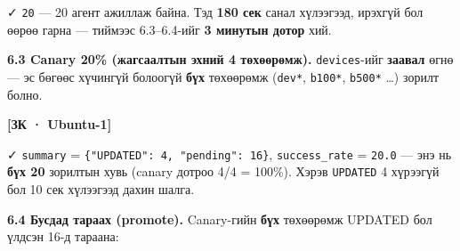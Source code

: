 ✓ \texttt{20} --- 20 агент ажиллаж байна. Тэд \textbf{180 сек} санал хүлээгээд, ирэхгүй бол өөрөө гарна --- тиймээс 6.3--6.4-ийг \textbf{3 минутын дотор} хий.

\textbf{6.3 Canary 20\% (жагсаалтын эхний 4 төхөөрөмж).} \texttt{devices}-ийг \textbf{заавал} өгнө --- эс бөгөөс хүчингүй болоогүй \textbf{бүх} төхөөрөмж (\texttt{dev*}, \texttt{b100*}, \texttt{b500*} \ldots) зорилт болно.

\textbf{{[}ЗК · Ubuntu-1{]}}

\begin{Shaded}
\begin{Highlighting}[]
\KeywordTok{|} \VariableTok{)}
 \KeywordTok{\textbackslash{}}
   \StringTok{:}\StringTok{,}\StringTok{:[}\StringTok{]\}"} \KeywordTok{|} \VariableTok{)}
  \KeywordTok{|} 
 \KeywordTok{|}   \KeywordTok{|} 
\end{Highlighting}
\end{Shaded}

✓ \texttt{summary} = \texttt{\{"UPDATED":\allowbreak{}\ 4,\ "pending":\allowbreak{}\ 16\}}, \texttt{success\_rate} = \texttt{20.0} --- энэ нь \textbf{бүх 20} зорилтын хувь (canary дотроо 4/4 = 100\%). Хэрэв \texttt{UPDATED} 4 хүрээгүй бол 10 сек хүлээгээд дахин шалга.

\textbf{6.4 Бусдад тараах (promote).} Canary-гийн \textbf{бүх} төхөөрөмж UPDATED бол үлдсэн 16-д тараана:


